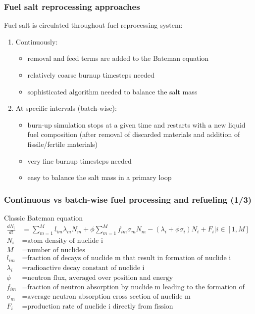\begin{frame}
\frametitle{Fuel salt reprocessing approaches}

Fuel salt is circulated throughout fuel reprocessing system:
\\
\begin{enumerate}
	\itemsep2em
	\item Continuously:
	\begin{itemize}
		\item removal and feed terms are added to the Bateman equation
		\item relatively coarse burnup timesteps needed
		\item sophisticated algorithm needed to balance the salt mass
	\end{itemize}
	\item At specific intervals (batch-wise): 
	\begin{itemize}
		\item burn-up simulation stops at a given time and restarts with a new 
		liquid fuel composition (after removal of discarded materials and
		addition of fissile/fertile materials)
		\item very fine burnup timesteps needed
		\item easy to balance the salt mass in a primary loop
	\end{itemize}
\end{enumerate}


\end{frame}


\begin{frame}
\frametitle{Continuous vs batch-wise fuel processing  and refueling (1/3)}
\vspace{-7mm}
\begin{block}{Classic Bateman equation}
	\begin{align}
	\frac{dN_i}{dt} &= \sum_{m=1}^{M}l_{im}\lambda_mN_m + 
	\phi\sum_{m=1}^{M}f_{im}\sigma_mN_m - (\lambda_i + \phi\sigma_i)N_i + F_i\Big|{i\in [1,M]} \nonumber\\
	N_i &= \mbox{atom density of nuclide i} \nonumber \\
	M &= \mbox{number of nuclides} \nonumber \\
	l_{im} &= \mbox{fraction of decays of nuclide m that result in formation of 
		nuclide i}\nonumber \\
	\lambda_i &= \mbox{radioactive decay constant of nuclide i} \nonumber \\
	\phi &= \mbox{neutron flux, averaged over position and energy} \nonumber \\
	f_{im} &= \mbox{fraction of neutron absorption by nuclide m leading to the 
		formation of nuclide i} \nonumber \\
	\sigma_m &= \mbox{average neutron absorption cross section of nuclide m} 
	\nonumber \\
	F_i &= \mbox{production rate of nuclide i directly from fission}\nonumber
	\end{align}
\end{block}
\end{frame}



